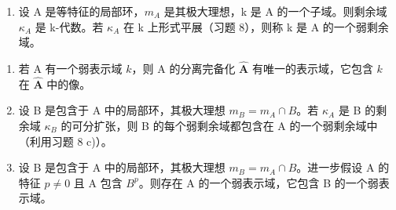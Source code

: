 \begin{enumerate}
\def\labelenumi{\arabic{enumi})}
\setcounter{enumi}{8}
\tightlist
\item
  设 A 是等特征的局部环，\(m_{A}\) 是其极大理想，k 是 A 的一个子域。则剩余域 \(\kappa_{A}\) 是 k-代数。若 \(\kappa_{A}\) 在 k 上形式平展（习题 8），则称 k 是 A 的一个弱剩余域。
\end{enumerate}

\begin{enumerate}
\def\labelenumi{\alph{enumi})}
\item
  若 A 有一个弱表示域 \(k\)，则 A 的分离完备化 \(\hat{\mathbf{A}}\) 有唯一的表示域，它包含 \(k\) 在 \(\hat{\mathbf{A}}\) 中的像。
\item
  设 B 是包含于 A 中的局部环，其极大理想 \(m_{B} = m_{A} \cap B\)。若 \(\kappa_{A}\) 是 B 的剩余域 \(\kappa_{B}\) 的可分扩张，则 B 的每个弱剩余域都包含在 A 的一个弱剩余域中（利用习题 8 c)）。
\item
  设 B 是包含于 A 中的局部环，其极大理想 \(m_{B} = m_{A} \cap B\)。进一步假设 A 的特征 \(p\ne0\) 且 A 包含 \(B^{p}\)。则存在 A 的一个弱表示域，它包含 B 的一个弱表示域。
\end{enumerate}
\relax{}
